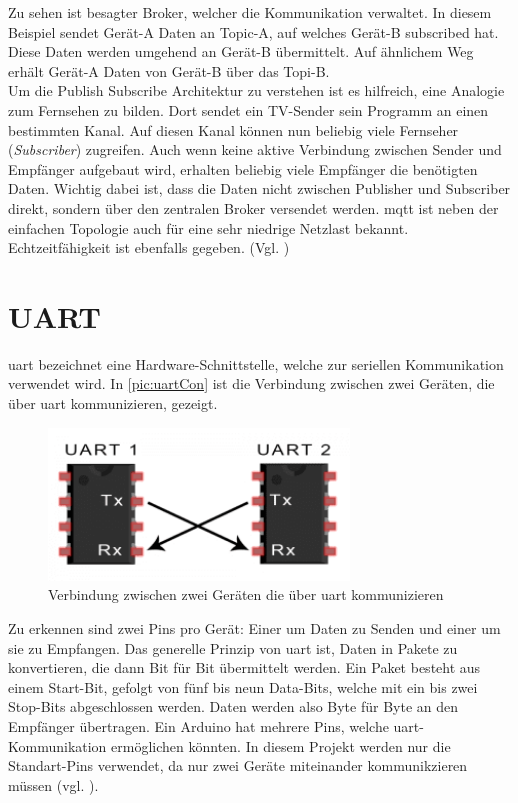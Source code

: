 Zu sehen ist besagter Broker, welcher die Kommunikation verwaltet. In diesem Beispiel sendet  Gerät-A Daten an Topic-A, auf welches Gerät-B subscribed hat. Diese Daten werden umgehend an Gerät-B übermittelt. Auf ähnlichem Weg erhält Gerät-A Daten von Gerät-B über das Topi-B.\\
Um die Publish Subscribe Architektur zu verstehen ist es hilfreich, eine Analogie zum Fernsehen zu bilden. Dort sendet ein TV-Sender sein Programm an einen bestimmten Kanal.
Auf diesen Kanal können nun beliebig viele Fernseher (\textit{Subscriber}) zugreifen. Auch wenn keine aktive Verbindung zwischen Sender und Empfänger aufgebaut wird, erhalten beliebig viele Empfänger die benötigten Daten.
Wichtig dabei ist, dass die Daten nicht zwischen Publisher und Subscriber direkt, sondern über den zentralen Broker versendet werden. \acrshort{mqtt} ist neben der einfachen Topologie auch für eine sehr niedrige Netzlast bekannt. Echtzeitfähigkeit ist ebenfalls gegeben. (Vgl. \cite{mqtt})



\section{UART}
\label{sec:uart}
\acrfull{uart} bezeichnet eine Hardware-Schnittstelle, welche zur seriellen Kommunikation verwendet wird. In \autoref{pic:uartCon} ist die Verbindung zwischen zwei Geräten, die über \acrshort{uart} kommunizieren, gezeigt.

\begin{figure}[h]
    \begin{center}
        \includegraphics[width=8cm]{uart.PNG}
        \caption{\label{pic:uartCon}Verbindung zwischen zwei Geräten die über \acrshort{uart} kommunizieren}
    \end{center}
\end{figure}

Zu erkennen sind zwei Pins pro Gerät: Einer um Daten zu Senden und einer um sie zu Empfangen. Das generelle Prinzip von \acrshort{uart} ist, Daten in Pakete zu konvertieren, die dann Bit für Bit übermittelt werden. Ein Paket besteht aus einem Start-Bit, gefolgt von fünf bis neun Data-Bits, welche mit ein bis zwei Stop-Bits abgeschlossen werden. Daten werden also Byte für Byte an den Empfänger übertragen. Ein Arduino hat mehrere Pins, welche \acrshort{uart}-Kommunikation ermöglichen könnten. In diesem Projekt werden nur die Standart-Pins verwendet, da nur zwei Geräte miteinander kommunikzieren müssen (vgl. \cite{uart}). 
\newpage
